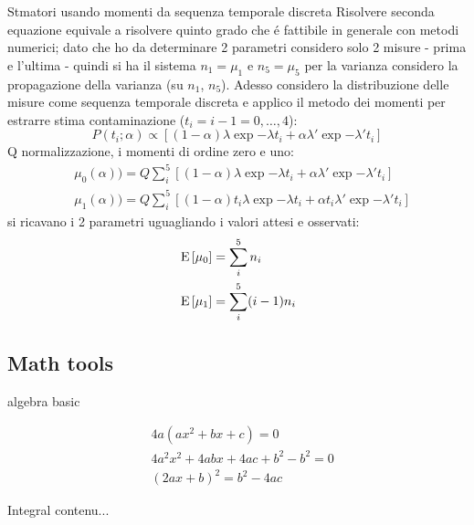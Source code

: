 \begin{frame}{Stmatori usando momenti da sequenza temporale discreta}
Risolvere seconda equazione equivale a risolvere quinto grado che \'e fattibile in generale con metodi numerici; dato che ho da determinare 2 parametri considero solo 2 misure - prima e l'ultima - quindi si ha il sistema $n_1=\mu_1$ e $n_5=\mu_5$ per la varianza considero la propagazione della varianza (su $n_1$, $n_5$).
Adesso considero la distribuzione delle misure come sequenza temporale discreta e applico il metodo dei momenti per estrarre stima contaminazione ($t_i=i-1=0,\ldots,4$):
\[P(t_i;\alpha)\propto[(1-\alpha)\lambda\exp{-\lambda t_i}+\alpha\lambda'\exp{-\lambda't_i}]\]
Q normalizzazione, i momenti di ordine zero e uno:
\begin{align*}
&\mu_0(\alpha))=Q\sum_i^5[(1-\alpha)\lambda\exp{-\lambda t_i}+\alpha\lambda'\exp{-\lambda't_i}]\\
&\mu_1(\alpha))=Q\sum_i^5[(1-\alpha)t_i\lambda\exp{-\lambda t_i}+\alpha t_i\lambda'\exp{-\lambda't_i}]
\end{align*}
si ricavano i 2 parametri uguagliando i valori attesi e osservati:
\begin{align*}
&\operatorname{E}{[\mu_0]}=\sum_i^5n_i\\
&\operatorname{E}{[\mu_1]}=\sum_i^5(i-1)n_i
\end{align*}
\end{frame}

\subsection{Math tools}
\begin{frame}{algebra basic}

\begin{align*}
&4a(ax^2+bx+c)=0\\
&4a^2x^2+4abx+4ac+b^2-b^2=0\\
&(2ax+b)^2=b^2-4ac
\end{align*}
%
\end{frame}

\begin{frame}{Integral}
	contenu...
\end{frame}